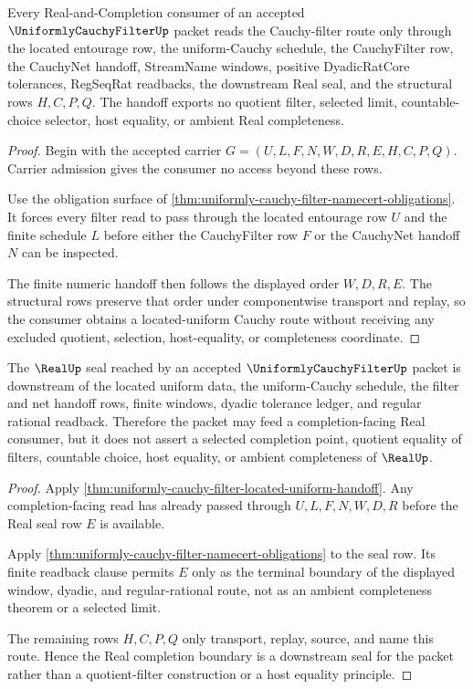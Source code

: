 \begin{theorem}
\label{thm:uniformly-cauchy-filter-located-uniform-handoff}
Every Real-and-Completion consumer of an accepted $\UniformlyCauchyFilterUp$ packet reads the Cauchy-filter route only through the located entourage row, the uniform-Cauchy schedule, the CauchyFilter row, the CauchyNet handoff, StreamName windows, positive DyadicRatCore tolerances, RegSeqRat readbacks, the downstream Real seal, and the structural rows $H,C,P,Q$. The handoff exports no quotient filter, selected limit, countable-choice selector, host equality, or ambient Real completeness.
\end{theorem}
\begin{proof}
Begin with the accepted carrier $G=(U,L,F,N,W,D,R,E,H,C,P,Q)$. Carrier admission gives the consumer no access beyond these rows.

Use the obligation surface of \autoref{thm:uniformly-cauchy-filter-namecert-obligations}. It forces every filter read to pass through the located entourage row $U$ and the finite schedule $L$ before either the CauchyFilter row $F$ or the CauchyNet handoff $N$ can be inspected.

The finite numeric handoff then follows the displayed order $W,D,R,E$. The structural rows preserve that order under componentwise transport and replay, so the consumer obtains a located-uniform Cauchy route without receiving any excluded quotient, selection, host-equality, or completeness coordinate.
\end{proof}

\begin{theorem}
\label{thm:uniformly-cauchy-filter-real-completion-boundary}
The $\RealUp$ seal reached by an accepted $\UniformlyCauchyFilterUp$ packet is downstream of the located uniform data, the uniform-Cauchy schedule, the filter and net handoff rows, finite windows, dyadic tolerance ledger, and regular rational readback. Therefore the packet may feed a completion-facing Real consumer, but it does not assert a selected completion point, quotient equality of filters, countable choice, host equality, or ambient completeness of $\RealUp$.
\end{theorem}
\begin{proof}
Apply \autoref{thm:uniformly-cauchy-filter-located-uniform-handoff}. Any completion-facing read has already passed through $U,L,F,N,W,D,R$ before the Real seal row $E$ is available.

Apply \autoref{thm:uniformly-cauchy-filter-namecert-obligations} to the seal row. Its finite readback clause permits $E$ only as the terminal boundary of the displayed window, dyadic, and regular-rational route, not as an ambient completeness theorem or a selected limit.

The remaining rows $H,C,P,Q$ only transport, replay, source, and name this route. Hence the Real completion boundary is a downstream seal for the packet rather than a quotient-filter construction or a host equality principle.
\end{proof}

